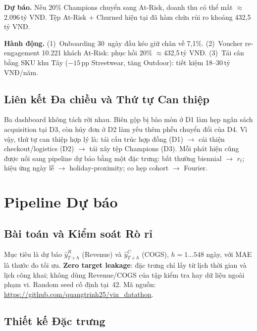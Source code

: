 \documentclass{article}
\begin{document}
\textbf{Dự báo.} Nếu 20\% Champions chuyển sang At-Risk, doanh thu có thể mất
$\approx$2.096\,tỷ VNĐ. Tệp At-Risk + Churned hiện tại đã hàm chứa rủi ro khoảng
432,5\,tỷ VNĐ.

\textbf{Hành động.} (1)~Onboarding 30~ngày đầu kéo giữ chân về 7,1\%.
(2)~Voucher re-engagement 10.221 khách At-Risk: phục hồi 20\% $\approx$432,5\,tỷ VNĐ.
(3)~Tái cân bằng SKU khu Tây ($-15$\,pp Streetwear, tăng Outdoor): tiết kiệm
18--30\,tỷ VNĐ/năm.

\subsection{Liên kết Đa chiều và Thứ tự Can thiệp}
\label{sec:strategy}

Ba dashboard không tách rời nhau. Biên gộp bị bào mòn ở D1 làm hẹp ngân sách
acquisition tại D3, còn hủy đơn ở D2 làm yếu thêm phễu chuyển đổi của D4. Vì
vậy, thứ tự can thiệp hợp lý là: tái cấu trúc hợp đồng (D1) $\to$ cải thiện
checkout/logistics (D2) $\to$ tái xây tệp Champions (D3). Mỗi phát hiện cũng
được nối sang pipeline dự báo bằng một đặc trưng: bất thường biennial $\to$
$r_t$; hiệu ứng ngày lễ $\to$ holiday-proximity; co hẹp cohort $\to$ Fourier.

\section{Pipeline Dự báo}
\label{sec:model}

\subsection{Bài toán và Kiểm soát Rò rỉ}
\label{sec:leakage}

Mục tiêu là dự báo $\hat{y}^{R}_{T+h}$ (Revenue) và $\hat{y}^{C}_{T+h}$ (COGS),
$h{=}1\ldots548$ ngày, với MAE là thước đo tối ưu. \textbf{Zero target leakage}:
đặc trưng chỉ lấy từ lịch thời gian và lịch công khai; không dùng Revenue/COGS
của tập kiểm tra hay dữ liệu ngoài phạm vi. Random seed cố định tại~42.
Mã nguồn: \url{https://github.com/quangtrinh25/vin_datathon}.

\subsection{Thiết kế Đặc trưng}
\label{sec:features}
\end{document}
